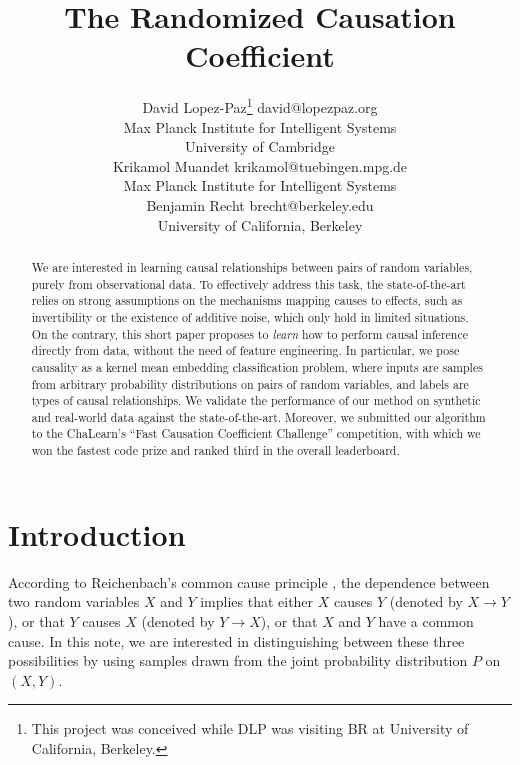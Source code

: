 \documentclass[twoside,11pt,a4paper]{article}
\begin{document}
 

\title{The Randomized Causation Coefficient}

\author{\name David Lopez-Paz\thanks{This project was conceived while DLP was
visiting BR at University of California, Berkeley.} \email david@lopezpaz.org
\\
        \addr Max Planck Institute for Intelligent Systems\\
        \addr University of Cambridge\\
        \name Krikamol Muandet \email krikamol@tuebingen.mpg.de \\
        \addr Max Planck Institute for Intelligent Systems\\
        \name Benjamin Recht  \email brecht@berkeley.edu\\
        \addr University of California, Berkeley\\
}

\maketitle 

\begin{abstract}%
  We are interested in learning causal relationships between pairs of random
  variables, purely from observational data. To effectively address this task,
  the state-of-the-art relies on strong assumptions on the mechanisms
  mapping causes to effects, such as invertibility or the existence of additive
  noise, which only hold in limited situations.
  On the contrary, this short paper proposes to \emph{learn} how to perform
  causal inference directly from data, without the need of feature
  engineering. In particular, we pose causality as a kernel mean embedding
  classification problem, where inputs are samples from arbitrary probability
  distributions on pairs of random variables, and labels are types of causal
  relationships.
  We validate the performance of our method on synthetic and real-world data
  against the state-of-the-art. Moreover, we submitted our algorithm to the
  ChaLearn's ``Fast Causation Coefficient Challenge'' competition, with which
  we won the fastest code prize and ranked third in the overall leaderboard.
\end{abstract}

\section{Introduction}\label{sec:intro}
According to Reichenbach's common cause principle \citep{Reichenbach56:Time},
the dependence between two random variables $X$ and $Y$ implies that either $X$
causes $Y$ (denoted by $X \rightarrow Y$), or that $Y$ causes $X$ (denoted by
$Y \rightarrow X$), or that $X$ and $Y$ have a common cause. In this note, we
are interested in distinguishing between these three possibilities by using
samples drawn from the joint probability distribution $P$ on $(X,Y)$.
\end{document}

